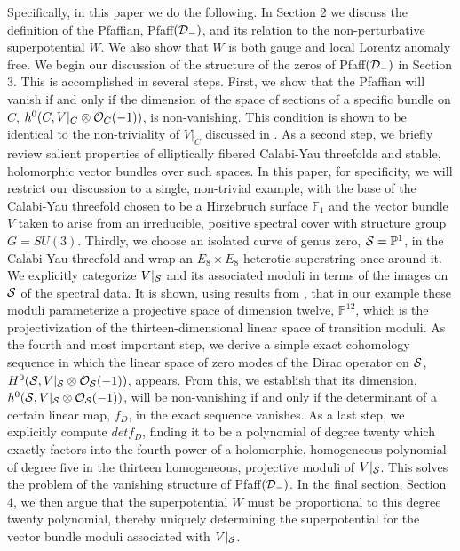 \documentclass[a4paper,12pt]{article}
\numberwithin{equation}{section}
\theoremstyle{plain}
\begin{document}
Specifically, in this paper we do the following. In Section 2 we discuss
the
definition of the Pfaffian, Pfaff$({\cal{D}}_{-})$, and its relation to
the
non-perturbative superpotential $W$.  We also show that $W$ is both gauge
and
local
Lorentz anomaly free. We begin our discussion of the structure of the
zeros
of Pfaff$({\cal{D}}_{-})$ in Section 3. This is accomplished in several
steps.
First, we show that the Pfaffian will vanish if and only if the dimension
of
the space of sections of a specific bundle on $C$, $h^{0}(C,
V|_{C} \otimes {\cal{O}}_{C}(-1))$, is non-vanishing. This condition is
shown to be identical to the non-triviality of $V|_{C}$ discussed in
\cite{Witten2}. As a second step,
we briefly review salient properties of elliptically
fibered Calabi-Yau threefolds and stable, holomorphic vector bundles over
such
spaces. In this paper, for specificity, we will restrict our discussion to
a
single, non-trivial example, with the base of the Calabi-Yau threefold
chosen
to be a Hirzebruch surface ${\mathbb F}_{1}$ and the vector bundle $V$
taken
to arise from an irreducible, positive spectral cover with structure group
$G=SU(3)$. Thirdly, we choose an isolated curve of genus zero,
${\cal{S}}={\mathbb P}^{1}$, in the Calabi-Yau threefold and wrap an
$E_{8} \times E_{8}$ heterotic superstring once around it. We explicitly
categorize $V|_{{\cal{S}}}$ and its associated moduli in terms of the
images on
${\cal{S}}$ of the spectral data. It is shown, using results
from \cite{BDOold},
that in our example these moduli parameterize a projective
space of dimension twelve,
${\mathbb P}^{12}$, which is the projectivization of the
thirteen-dimensional
linear
space of transition moduli. As the fourth and most important step, we
derive a
simple exact cohomology sequence in which the linear space of zero modes
of
the Dirac operator on ${\cal{S}}$, $H^{0}({\cal{S}}, V|_{{\cal{S}}}
\otimes
{\cal{O}}_{{\cal{S}}}(-1))$, appears. From this, we establish that its
dimension,
$h^{0}({\cal{S}}, V|_{{\cal{S}}} \otimes {\cal{O}}_{{\cal{S}}}(-1))$, will
be
non-vanishing if and only if the determinant of a certain linear map,
$f_{D}$,
in the exact sequence vanishes. As a last step, we explicitly compute
$detf_{D}$, finding it to be a polynomial of
degree twenty which exactly factors into the fourth power of a
holomorphic,
homogeneous polynomial of degree five in the thirteen homogeneous,
projective
moduli of $V|_{{\cal{S}}}$.
This solves the problem
of the vanishing structure of Pfaff$({\cal{D}}_{-})$.
In the final section, Section 4, we then argue that the
superpotential $W$ must be proportional to this degree twenty polynomial, 
thereby uniquely determining the
superpotential for the vector bundle moduli associated with
$V|_{{\cal{S}}}$.
\end{document}
